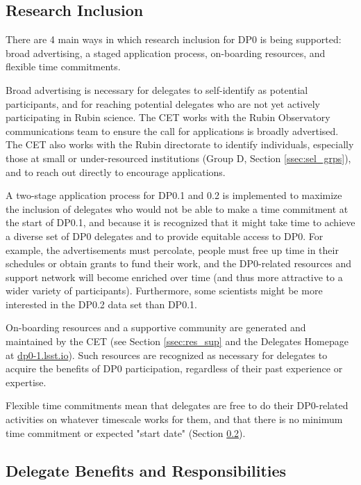 \documentclass[DM,lsstdraft,authoryear,toc]{lsstdoc}
\begin{document}
\subsection{Research Inclusion}\label{ssec:intro_RI}

There are 4 main ways in which research inclusion for DP0 is being supported: broad advertising, a staged application process, on-boarding resources, and flexible time commitments.

Broad advertising is necessary for delegates to self-identify as potential participants, and for reaching potential delegates who are not yet actively participating in Rubin science.
The CET works with the Rubin Observatory communications team to ensure the call for applications is broadly advertised. 
The CET also works with the Rubin directorate to identify individuals, especially those at small or under-resourced institutions (Group D, Section \ref{ssec:sel_grps}), and to reach out directly to encourage applications. 

A two-stage application process for DP0.1 and 0.2 is implemented to maximize the inclusion of delegates who would not be able to make a time commitment at the start of DP0.1, and because it is recognized that it might take time to achieve a diverse set of DP0 delegates and to provide equitable access to DP0.
For example, the advertisements must percolate, people must free up time in their schedules or obtain grants to fund their work, and the DP0-related resources and support network will become enriched over time (and thus more attractive to a wider variety of participants).
Furthermore, some scientists might be more interested in the DP0.2 data set than DP0.1.

On-boarding resources and a supportive community are generated and maintained by the CET (see Section \ref{ssec:res_sup} and the Delegates Homepage at \url{dp0-1.lsst.io}).
Such resources are recognized as necessary for delegates to acquire the benefits of DP0 participation, regardless of their past experience or expertise.

Flexible time commitments mean that delegates are free to do their DP0-related activities on whatever timescale works for them, and that there is no minimum time commitment or expected "start date" (Section \ref{ssec:intro_del}).


\subsection{Delegate Benefits and Responsibilities}\label{ssec:intro_del}
\end{document}
